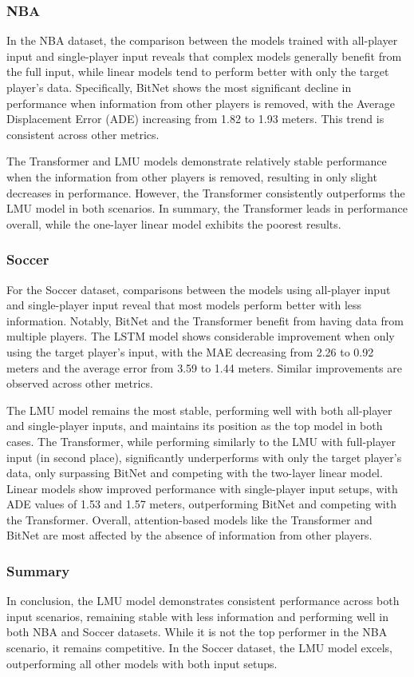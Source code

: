 \subsubsection{NBA}

In the NBA dataset, the comparison between the models trained with all-player input and single-player input reveals that complex models generally benefit from the full input, while linear models tend to perform better with only the target player's data. Specifically, BitNet shows the most significant decline in performance when information from other players is removed, with the Average Displacement Error (ADE) increasing from 1.82 to 1.93 meters. This trend is consistent across other metrics.

The Transformer and LMU models demonstrate relatively stable performance when the information from other players is removed, resulting in only slight decreases in performance. However, the Transformer consistently outperforms the LMU model in both scenarios. In summary, the Transformer leads in performance overall, while the one-layer linear model exhibits the poorest results.

\subsubsection{Soccer}

For the Soccer dataset, comparisons between the models using all-player input and single-player input reveal that most models perform better with less information. Notably, BitNet and the Transformer benefit from having data from multiple players. The LSTM model shows considerable improvement when only using the target player's input, with the MAE decreasing from 2.26 to 0.92 meters and the average error from 3.59 to 1.44 meters. Similar improvements are observed across other metrics.

The LMU model remains the most stable, performing well with both all-player and single-player inputs, and maintains its position as the top model in both cases. The Transformer, while performing similarly to the LMU with full-player input (in second place), significantly underperforms with only the target player's data, only surpassing BitNet and competing with the two-layer linear model. Linear models show improved performance with single-player input setups, with ADE values of 1.53 and 1.57 meters, outperforming BitNet and competing with the Transformer. Overall, attention-based models like the Transformer and BitNet are most affected by the absence of information from other players.

\subsubsection{Summary}

In conclusion, the LMU model demonstrates consistent performance across both input scenarios, remaining stable with less information and performing well in both NBA and Soccer datasets. While it is not the top performer in the NBA scenario, it remains competitive. In the Soccer dataset, the LMU model excels, outperforming all other models with both input setups.
